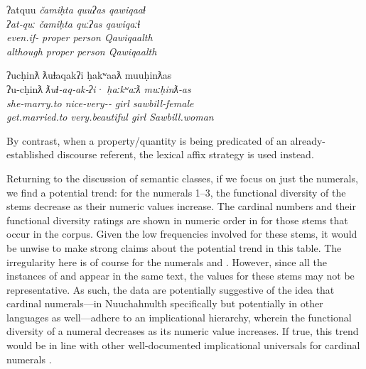 \begin{exe}
  \ex\label{ex:4.6}
  \begin{xlist}

    \ex\label{ex:4.6a}
    \gllll ʔatquu              \em{čamiḥta} quuʔas qawiqaaɬ\\
           ʔat‑quː             \em{čamiḥta} quːʔas qawiqaːɬ\\
           even.if‑ \em{proper}  person Qawiqaalth\\
           although            \em{proper}  person Qawiqaalth\\

    \ex\label{ex:4.6b}
    \gllll ʔucḥinƛ        ƛuɬaqakʔi                      ḥakʷaaƛ  muuḥinƛas\\
           ʔu‑cḥinƛ       \em{ƛuɬ}‑aq‑ak‑ʔi·               ḥaːkʷaːƛ muːḥinƛ‑as\\
           she‑marry.to   \em{nice}‑very‑‑ girl     sawbill‑female\\
           get.married.to very.beautiful                 girl     Sawbill.woman\\

  \end{xlist}
\end{exe}

\noindent By contrast, when a property/quantity is being predicated of an already-established discourse referent, the lexical affix strategy is used instead.

Returning to the discussion of semantic classes, if we focus on just the numerals, we find a potential trend: for the numerals 1–3, the functional diversity of the stems decrease as their numeric values increase. The cardinal numbers and their functional diversity ratings are shown in numeric order in  for those stems that occur in the corpus. Given the low frequencies involved for these stems, it would be unwise to make strong claims about the potential trend in this table. The irregularity here is of course for the numerals  and . However, since all the instances of  and  appear in the same text, the values for these stems may not be representative. As such, the data are potentially suggestive of the idea that cardinal numerals—in Nuuchahnulth specifically but potentially in other languages as well—adhere to an implicational hierarchy, wherein the functional diversity of a numeral decreases as its numeric value increases. If true, this trend would be in line with other well-documented implicational universals for cardinal numerals \parencites{DehaeneMehler1992}[141]{Croft2003}.

